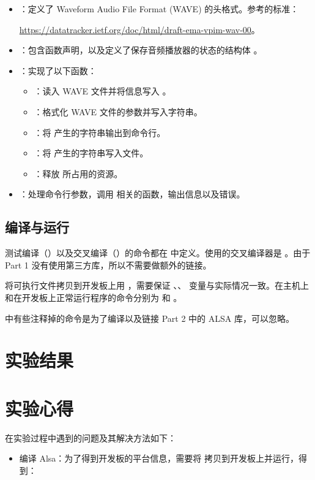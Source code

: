\begin{itemize}
    \item {}：定义了 Waveform Audio File Format (WAVE) 的头格式。参考的标准：
    
    \url{https://datatracker.ietf.org/doc/html/draft-ema-vpim-wav-00}。
    \item {}：包含函数声明，以及定义了保存音频播放器的状态的结构体 。
    \item {}：实现了以下函数：
    \begin{itemize}
        \item {}：读入 WAVE 文件并将信息写入 。
        \item {}：格式化 WAVE 文件的参数并写入字符串。
        \item {}：将  产生的字符串输出到命令行。
        \item {}：将  产生的字符串写入文件。
        \item {}：释放  所占用的资源。
    \end{itemize}
    \item {}：处理命令行参数，调用  相关的函数，输出信息以及错误。
\end{itemize}

\subsection{编译与运行}\label{sec:compile}

测试编译（）以及交叉编译（）的命令都在  中定义。使用的交叉编译器是 。由于 Part 1 没有使用第三方库，所以不需要做额外的链接。

将可执行文件拷贝到开发板上用 ，需要保证 、、 变量与实际情况一致。在主机上和在开发板上正常运行程序的命令分别为  和 。

 中有些注释掉的命令是为了编译以及链接 Part 2 中的 ALSA 库，可以忽略。

\section{实验结果}




\newpage

\section{实验心得}\label{sec:problem}

在实验过程中遇到的问题及其解决方法如下：

\begin{itemize}
    \item 编译 Alsa：为了得到开发板的平台信息，需要将  拷贝到开发板上并运行，得到：
    
\end{itemize}
